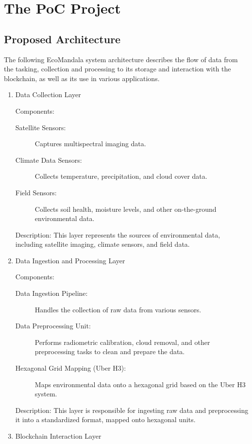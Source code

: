 \documentclass{scrreport}
\begin{document}
\chapter{The PoC Project}
\label{chap:project}

\section{Proposed Architecture}

The following EcoMandala system architecture describes the flow of data from the tasking, collection and processing to its storage and interaction with the blockchain, as well as its use in various applications.

\begin{enumerate}
    \item Data Collection Layer

    Components:
    \begin{description}
        \item[Satellite Sensors:] Captures multispectral imaging data.
        \item[Climate Data Sensors:] Collects temperature, precipitation, and cloud cover data.
        \item[Field Sensors:] Collects soil health, moisture levels, and other on-the-ground environmental data.
    \end{description}
    Description: This layer represents the sources of environmental data, including satellite imaging, climate sensors, and field data.

    \item Data Ingestion and Processing Layer

    Components:
    \begin{description}
        \item[Data Ingestion Pipeline:] Handles the collection of raw data from various sensors.
        \item[Data Preprocessing Unit:] Performs radiometric calibration, cloud removal, and other preprocessing tasks to clean and prepare the data.
        \item[Hexagonal Grid Mapping (Uber H3):] Maps environmental data onto a hexagonal grid based on the Uber H3 system.
    \end{description}
    Description: This layer is responsible for ingesting raw data and preprocessing it into a standardized format, mapped onto hexagonal units.

    \item Blockchain Interaction Layer
    

\end{enumerate}
\end{document}
